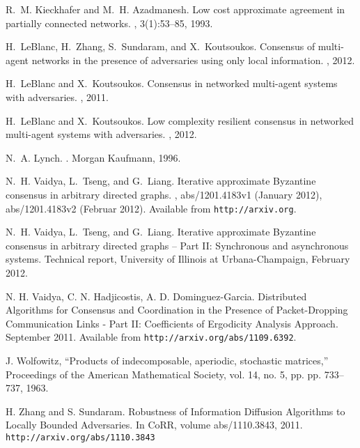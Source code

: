 \documentclass[letterpaper, 12pt]{article}
\begin{document}
\begin{thebibliography}{10}
R.~M. Kieckhafer and M.~H. Azadmanesh.
\newblock Low cost approximate agreement in partially connected networks.
, 3(1):53--85, 1993.


H.~LeBlanc, H.~Zhang, S.~Sundaram, and X.~Koutsoukos.
\newblock Consensus of multi-agent networks in the presence of adversaries
  using only local information.
, 2012.

H.~LeBlanc and X.~Koutsoukos.
\newblock Consensus in networked multi-agent systems with adversaries.
, 2011.

H.~LeBlanc and X.~Koutsoukos.
\newblock Low complexity resilient consensus in networked multi-agent systems
  with adversaries.
, 2012.

N.~A. Lynch.
.
\newblock Morgan Kaufmann, 1996.


N.~H. Vaidya, L.~Tseng, and G.~Liang.
\newblock Iterative approximate Byzantine consensus in arbitrary directed
  graphs.
, abs/1201.4183v1 (January 2012), abs/1201.4183v2 (Februar 2012).
Available from {\tt http://arxiv.org}.

N.~H. Vaidya, L.~Tseng, and G.~Liang.
\newblock Iterative approximate Byzantine consensus in arbitrary directed
  graphs -- Part II: Synchronous and asynchronous systems.
\newblock Technical report, University of Illinois at Urbana-Champaign,
  February 2012.

N. H. Vaidya, C. N. Hadjicostis, A. D. Dominguez-Garcia.
Distributed Algorithms for Consensus and Coordination in the Presence of Packet-Dropping Communication Links - Part II: Coefficients of Ergodicity Analysis Approach. September 2011. Available from {\tt http://arxiv.org/abs/1109.6392}.

J. Wolfowitz, “Products of indecomposable, aperiodic, stochastic matrices,” Proceedings of the American Mathematical Society,
vol. 14, no. 5, pp. pp. 733--737, 1963.

H. Zhang and S. Sundaram. Robustness of Information Diffusion Algorithms to Locally Bounded Adversaries. In CoRR, volume abs/1110.3843, 2011. {\tt http://arxiv.org/abs/1110.3843}

\end{thebibliography}
\end{document}

